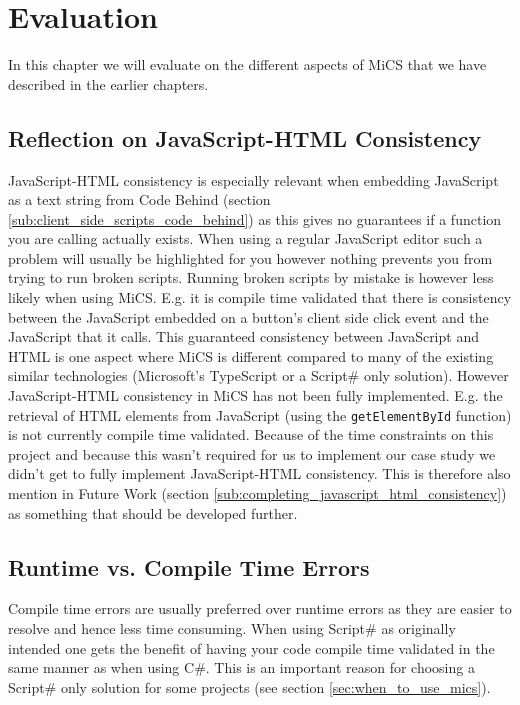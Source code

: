 \chapter{Evaluation}
	In this chapter we will evaluate on the different aspects of MiCS that we have described in the earlier chapters.







\section{Reflection on JavaScript-HTML Consistency} %
\label{sec:reflection_on_server_client_consistency}
	JavaScript-HTML consistency is especially relevant when embedding JavaScript as a text string from Code Behind (section \ref{sub:client_side_scripts_code_behind}) as this gives no guarantees if a function you are calling actually exists. When using a regular JavaScript editor such a problem will usually be highlighted for you however nothing prevents you from trying to run broken scripts. Running broken scripts by mistake is however less likely when using MiCS. E.g. it is compile time validated that there is consistency between the JavaScript embedded on a button’s client side click event and the JavaScript that it calls. This guaranteed consistency between JavaScript and HTML is one aspect where MiCS is different compared to many of the existing similar technologies (Microsoft’s TypeScript or a Script\# only solution). However JavaScript-HTML consistency in MiCS has not been fully implemented. E.g. the retrieval of HTML elements from JavaScript (using the \texttt{getElementById} function) is not currently compile time validated. Because of the time constraints on this project and because this wasn’t required for us to implement our case study we didn’t  get to fully implement JavaScript-HTML consistency. This is therefore also mention in Future Work (section \ref{sub:completing_javascript_html_consistency}) as something that should be developed further.

\section{Runtime vs. Compile Time Errors} %
\label{sec:runtime_vs_compile_time_errors}
	Compile time errors are usually preferred over runtime errors as they are easier to resolve and hence less time consuming. When using Script\# as originally intended one gets the benefit of having your code compile time validated in the same manner as when using C\#. This is an important reason for choosing a Script\# only solution for some projects (see section \ref{sec:when_to_use_mics}).

